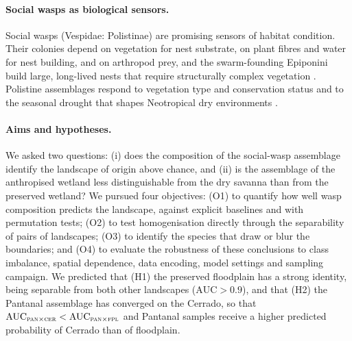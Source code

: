 \documentclass[10pt,a4paper,twocolumn]{article}
\newcommand{\Fpl}{\textsc{fpl}}
\newcommand{\Pan}{\textsc{pan}}
\newcommand{\Cer}{\textsc{cer}}
\newcommand{\AUC}{\mathrm{AUC}}
\begin{document}
\paragraph{Social wasps as biological sensors.}
Social wasps (Vespidae: Polistinae) are promising sensors of habitat condition. Their colonies
depend on vegetation for nest substrate, on plant fibres and water for nest building, and on
arthropod prey, and the swarm-founding Epiponini build large, long-lived nests that require
structurally complex vegetation \citep{richards1978,jeanne1991}. Polistine assemblages respond to
vegetation type and conservation status \citep{decastro2021,francisco2023,leite2026} and to the
seasonal drought that shapes Neotropical dry environments \citep{jacques2023}.

\paragraph{Aims and hypotheses.}
We asked two questions: (i) does the composition of the social-wasp assemblage identify the
landscape of origin above chance, and (ii) is the assemblage of the anthropised wetland less
distinguishable from the dry savanna than from the preserved wetland? We pursued four objectives:
(O1) to quantify how well wasp composition predicts the landscape, against explicit baselines and
with permutation tests; (O2) to test homogenisation directly through the separability of pairs of
landscapes; (O3) to identify the species that draw or blur the boundaries; and (O4) to evaluate the
robustness of these conclusions to class imbalance, spatial dependence, data encoding, model
settings and sampling campaign. We predicted that (H1) the preserved floodplain has a strong
identity, being separable from both other landscapes ($\AUC > 0.9$), and that (H2) the Pantanal
assemblage has converged on the Cerrado, so that $\AUC_{\Pan\times\Cer} < \AUC_{\Pan\times\Fpl}$
and Pantanal samples receive a higher predicted probability of Cerrado than of floodplain.
\end{document}
